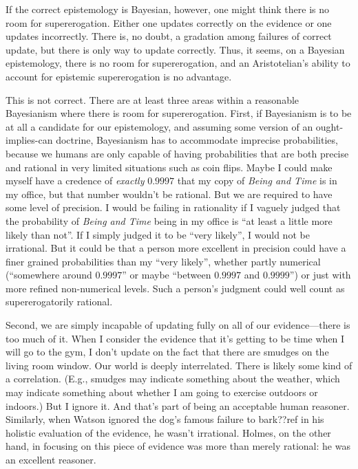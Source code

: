 If the correct epistemology is Bayesian, however, one might think there is no room for supererogation. Either one updates
correctly on the evidence or one updates incorrectly. There is, no doubt, a gradation among failures of correct update, 
but there is only way to update correctly.  Thus, it seems, on a Bayesian epistemology, there is no room for supererogation,
and an Aristotelian's ability to account for epistemic supererogation is no advantage.

This is not correct. There are at least three areas within a reasonable Bayesianism where there is room for supererogation.
First, if Bayesianism is to be at all a candidate for our epistemology, and assuming some version of an ought-implies-can doctrine,
Bayesianism has to accommodate imprecise probabilities, because we humans are only capable of having  
probabilities that are both precise and rational in very limited situations such as coin flips. Maybe I could make myself
have a credence of \textit{exactly} $0.9997$ that my copy of \textit{Being and Time} is in my office, but that number wouldn't 
be rational. But we are required to have some level of precision. I would be failing in rationality if I vaguely judged
that the probability of \textit{Being and Time} being in my office is ``at least a little more likely than not''. If I
simply judged it to be ``very likely'', I would not be irrational. But it could be that a person more excellent in precision
could have a finer grained probabilities than my ``very likely'', whether partly numerical (``somewhere around $0.9997$'' or
maybe ``between $0.9997$ and $0.9999$'') or just with more refined non-numerical levels. Such a person's judgment could well
count as supererogatorily rational. 

Second, we are simply incapable of updating fully on all of our evidence---there is too much of it. When
I consider the evidence that it's getting to be time when I will go to the gym, I don't update on the fact that there are
smudges on the living room window. Our world is deeply interrelated. There is likely some kind of a correlation. (E.g.,
smudges may indicate something about the weather, which may indicate something about whether I am going to exercise outdoors
or indoors.) But I ignore it. And that's part of being an acceptable human reasoner. Similarly, when Watson ignored the dog's
famous failure to bark??ref in his holistic evaluation of the evidence, he wasn't irrational. Holmes, on the other hand, in focusing
on this piece of evidence was more than merely rational: he was an excellent reasoner. 

